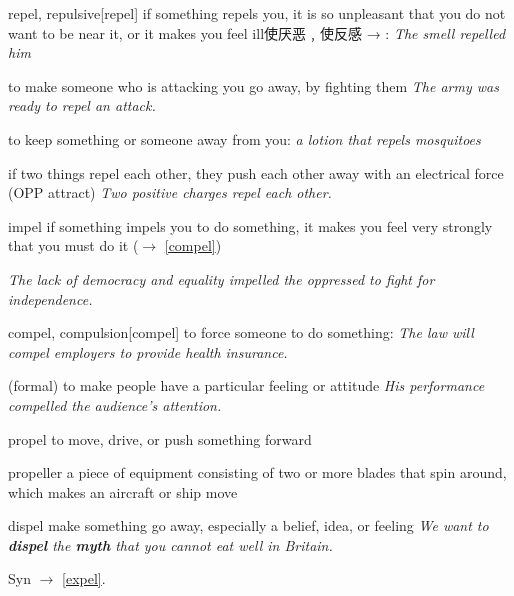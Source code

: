 \begin{word}{repel, repulsive}[repel]
    if something repels you, it is so unpleasant that you do not want to be near it, or it makes you feel ill使厌恶﹐使反感 → :
    \textit{The smell repelled him}

    to make someone who is attacking you go away, by fighting them
    \textit{The army was ready to repel an attack.}

    to keep something or someone away from you:
    \textit{a lotion that repels mosquitoes}

    if two things repel each other, they push each other away with an electrical force (OPP attract)
    \textit{Two positive charges repel each other.}
\end{word}

\begin{word}{impel}
    if something impels you to do something, it makes you feel very strongly that you must do it ($\rightarrow$ \ref{compel})

    \textit{The lack of democracy and equality impelled the oppressed to fight for independence.}
\end{word}

\begin{word}{compel,  compulsion}[compel]
    to force someone to do something:
    \textit{The law will compel employers to provide health insurance.}

    (formal) to make people have a particular feeling or attitude
    \textit{His performance compelled the audience’s attention.}
\end{word}

\begin{word}{propel}
    to move, drive, or push something forward
\end{word}


\begin{word}{propeller}
    a piece of equipment consisting of two or more blades that spin around, which makes an aircraft or ship move
\end{word}

\begin{word}{dispel}
    make something go away, especially a belief, idea, or feeling
    \textit{We want to \textbf{dispel} the \textbf{myth} that you cannot eat well in Britain.}

    Syn $\rightarrow$ \ref{expel}.
\end{word}

